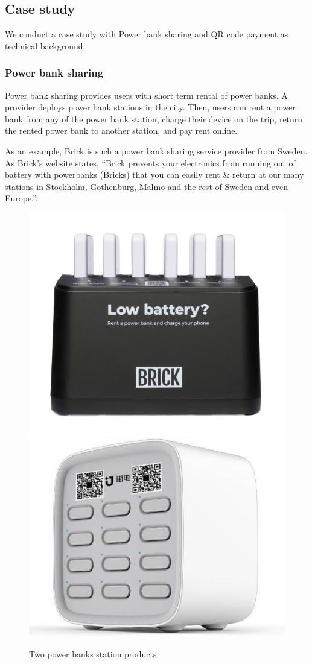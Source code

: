 \subsection{Case study}

We conduct a case study with Power bank sharing and QR code payment as technical background.

\subsubsection{Power bank sharing}

Power bank sharing provides users with short term rental of power banks. A provider deploys power bank stations in the city. Then, users can rent a power bank from any of the power bank station, charge their device on the trip, return the rented power bank to another station, and pay rent online.

As an example, Brick is such a power bank sharing service provider from Sweden. As Brick's website states, ``Brick prevents your electronics from running out of battery with powerbanks (Bricks) that you can easily rent \& return at our many stations in Stockholm, Gothenburg, Malmö and the rest of Sweden and even Europe.''. 


\begin{figure}[hbtp]
	\centering
	\includegraphics[width=.4 \linewidth]{./Figs/Brick_station.png}
	\includegraphics[width=.4 \linewidth]{./Figs/jiedian.jpg}
	\caption{Two power banks station products}
	\label{fig:PBS_products}
\end{figure}

